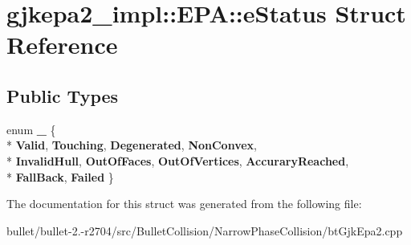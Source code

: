 \hypertarget{structgjkepa2__impl_1_1_e_p_a_1_1e_status}{\section{gjkepa2\+\_\+impl\+:\+:E\+P\+A\+:\+:e\+Status Struct Reference}
\label{structgjkepa2__impl_1_1_e_p_a_1_1e_status}
}
\subsection*{Public Types}
\begin{DoxyCompactItemize}
\item 
\hypertarget{structgjkepa2__impl_1_1_e_p_a_1_1e_status_a0bc55f16c679e32afbba1952f6a627be}{enum {\bfseries \+\_\+} \{ \\*
{\bfseries Valid}, 
{\bfseries Touching}, 
{\bfseries Degenerated}, 
{\bfseries Non\+Convex}, 
\\*
{\bfseries Invalid\+Hull}, 
{\bfseries Out\+Of\+Faces}, 
{\bfseries Out\+Of\+Vertices}, 
{\bfseries Accurary\+Reached}, 
\\*
{\bfseries Fall\+Back}, 
{\bfseries Failed}
 \}}\label{structgjkepa2__impl_1_1_e_p_a_1_1e_status_a0bc55f16c679e32afbba1952f6a627be}

\end{DoxyCompactItemize}


The documentation for this struct was generated from the following file\+:\begin{DoxyCompactItemize}
\item 
bullet/bullet-\/2.-\/r2704/src/\+Bullet\+Collision/\+Narrow\+Phase\+Collision/bt\+Gjk\+Epa2.\+cpp\end{DoxyCompactItemize}
